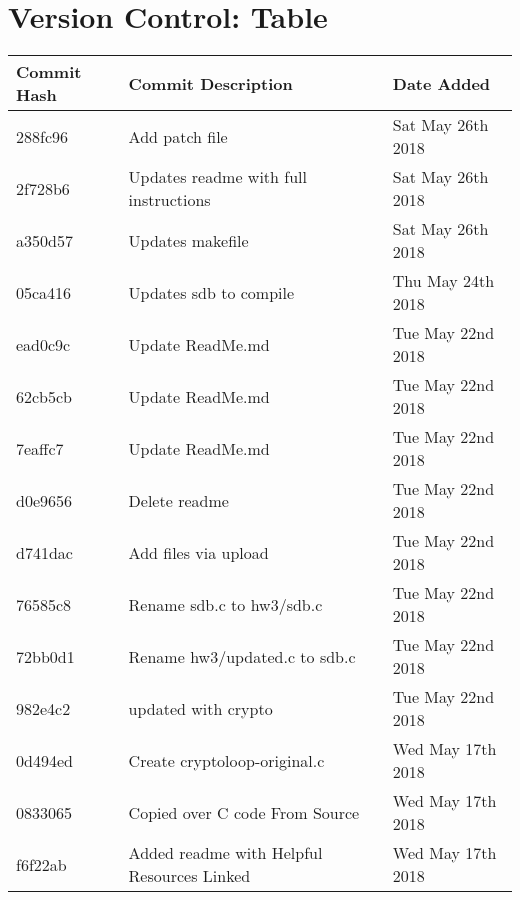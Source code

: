 \documentclass[onecolumn, draftclsnofoot,10pt, compsoc]{IEEEtran}
\begin{document}
\section{Version Control: Table}
  \begin{tabular} {| p{2.0cm} | p{7.4cm}  | p{5.0cm} | }
\hline
\textbf{Commit Hash} & \textbf{Commit Description} & \textbf{Date Added}  \\
\hline 288fc96 & Add patch file & Sat May 26th 2018 \\
\hline 2f728b6 & Updates readme with full instructions & Sat May 26th 2018 \\
\hline a350d57 & Updates makefile & Sat May 26th 2018 \\


\hline 05ca416 & Updates sdb to compile & Thu May 24th 2018 \\


\hline ead0c9c & Update ReadMe.md & Tue May 22nd 2018 \\
\hline 62cb5cb & Update ReadMe.md & Tue May 22nd 2018 \\
\hline 7eaffc7 & Update ReadMe.md & Tue May 22nd 2018\\
\hline d0e9656 & Delete readme & Tue May 22nd 2018\\
\hline d741dac & Add files via upload & Tue May 22nd 2018\\
\hline 76585c8 & Rename sdb.c to hw3/sdb.c & Tue May 22nd 2018 \\

\hline 72bb0d1 & Rename hw3/updated.c to sdb.c & Tue May 22nd 2018\\

\hline 982e4c2 & updated with crypto & Tue May 22nd 2018 \\



\hline 0d494ed & Create cryptoloop-original.c &  Wed May 17th 2018\\

\hline 0833065 & Copied over C code From Source &  Wed May 17th 2018\\

\hline  f6f22ab & Added readme with Helpful Resources Linked &  Wed May 17th 2018\\


\hline
\end {tabular}
\\ \\
\end{document}
